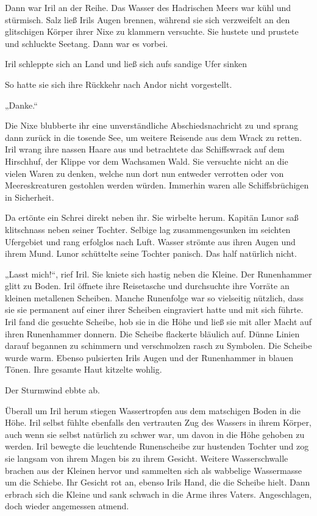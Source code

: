 Dann war Iril an der Reihe. Das Wasser des Hadrischen Meers war kühl und stürmisch. Salz ließ Irils Augen brennen, während sie sich verzweifelt an den glitschigen Körper ihrer Nixe zu klammern versuchte. Sie hustete und prustete und schluckte Seetang. Dann war es vorbei.

Iril schleppte sich an Land und ließ sich aufs sandige Ufer sinken

So hatte sie sich ihre Rückkehr nach Andor nicht vorgestellt.

„Danke.“

Die Nixe blubberte ihr eine unverständliche Abschiedsnachricht zu und sprang dann zurück in die tosende See, um weitere Reisende aus dem Wrack zu retten. Iril wrang ihre nassen Haare aus und betrachtete das Schiffswrack auf dem Hirschhuf, der Klippe vor dem Wachsamen Wald. Sie versuchte nicht an die vielen Waren zu denken, welche nun dort nun entweder verrotten oder von Meereskreaturen gestohlen werden würden. Immerhin waren alle Schiffsbrüchigen in Sicherheit.

Da ertönte ein Schrei direkt neben ihr. Sie wirbelte herum. Kapitän Lunor saß klitschnass neben seiner Tochter. Selbige lag zusammengesunken im seichten Ufergebiet und rang erfolglos nach Luft. Wasser strömte aus ihren Augen und ihrem Mund. Lunor schüttelte seine Tochter panisch. Das half natürlich nicht.

„Lasst mich!“, rief Iril. Sie kniete sich hastig neben die Kleine. Der Runenhammer glitt zu Boden. Iril öffnete ihre Reisetasche und durchsuchte ihre Vorräte an kleinen metallenen Scheiben. Manche Runenfolge war so vielseitig nützlich, dass sie sie permanent auf einer ihrer Scheiben eingraviert hatte und mit sich führte. Iril fand die gesuchte Scheibe, hob sie in die Höhe und ließ sie mit aller Macht auf ihren Runenhammer donnern. Die Scheibe flackerte bläulich auf. Dünne Linien darauf begannen zu schimmern und verschmolzen rasch zu Symbolen. Die Scheibe wurde warm. Ebenso pulsierten Irils Augen und der Runenhammer in blauen Tönen. Ihre gesamte Haut kitzelte wohlig.

Der Sturmwind ebbte ab.

Überall um Iril herum stiegen Wassertropfen aus dem matschigen Boden in die Höhe. Iril selbst fühlte ebenfalls den vertrauten Zug des Wassers in ihrem Körper, auch wenn sie selbst natürlich zu schwer war, um davon in die Höhe gehoben zu werden. Iril bewegte die leuchtende Runenscheibe zur hustenden Tochter und zog sie langsam von ihrem Magen bis zu ihrem Gesicht. Weitere Wasserschwalle brachen aus der Kleinen hervor und sammelten sich als wabbelige Wassermasse um die Schiebe. Ihr Gesicht rot an, ebenso Irils Hand, die die Scheibe hielt. Dann erbrach sich die Kleine und sank schwach in die Arme ihres Vaters. Angeschlagen, doch wieder angemessen atmend.

